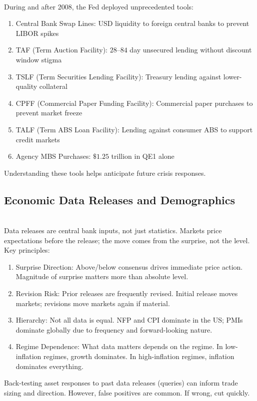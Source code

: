 \documentclass[a4paper,oneside,openany]{book}
\begin{document}
\begin{remark} \\
During and after 2008, the Fed deployed unprecedented tools:
\begin{enumerate}[label=\roman*.]
\setlength{\itemsep}{0pt}
\item Central Bank Swap Lines: USD liquidity to foreign central banks to prevent LIBOR spikes
\item TAF (Term Auction Facility): $28$--$84$ day unsecured lending without discount window stigma
\item TSLF (Term Securities Lending Facility): Treasury lending against lower-quality collateral
\item CPFF (Commercial Paper Funding Facility): Commercial paper purchases to prevent market freeze
\item TALF (Term ABS Loan Facility): Lending against consumer ABS to support credit markets
\item Agency MBS Purchases: $\$1.25$ trillion in QE1 alone
\end{enumerate}
Understanding these tools helps anticipate future crisis responses.
\end{remark}

\subsection*{Economic Data Releases and Demographics}

\begin{remark} \\
Data releases are central bank inputs, not just statistics. Markets price expectations before the release; the move comes from the surprise, not the level. Key principles:
\begin{enumerate}[label=\roman*.]
\setlength{\itemsep}{0pt}
\item Surprise Direction: Above/below consensus drives immediate price action. Magnitude of surprise matters more than absolute level.
\item Revision Risk: Prior releases are frequently revised. Initial release moves markets; revisions move markets again if material.
\item Hierarchy: Not all data is equal. NFP and CPI dominate in the US; PMIs dominate globally due to frequency and forward-looking nature.
\item Regime Dependence: What data matters depends on the regime. In low-inflation regimes, growth dominates. In high-inflation regimes, inflation dominates everything.
\end{enumerate}
Back-testing asset responses to past data releases (queries) can inform trade sizing and direction. However, false positives are common. If wrong, cut quickly.
\end{remark}
\end{document}
